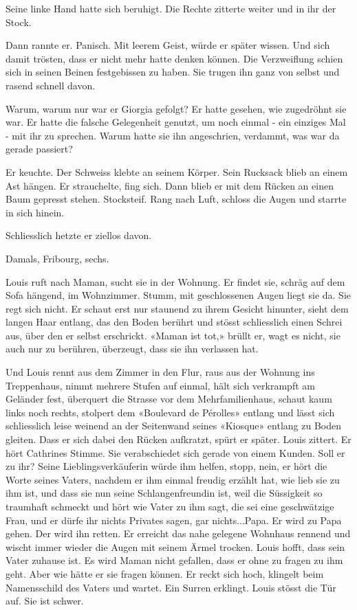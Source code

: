 Seine linke Hand hatte sich beruhigt. Die Rechte zitterte weiter und in
ihr der Stock.

Dann rannte er. Panisch. Mit leerem Geist, würde er später wissen. Und
sich damit trösten, dass er nicht mehr hatte denken können. Die
Verzweiflung schien sich in seinen Beinen festgebissen zu haben. Sie
trugen ihn ganz von selbst und rasend schnell davon.

Warum, warum nur war er Giorgia gefolgt? Er hatte gesehen, wie
zugedröhnt sie war. Er hatte die falsche Gelegenheit genutzt, um noch
einmal - ein einziges Mal - mit ihr zu sprechen. Warum hatte sie ihn
angeschrien, verdammt, was war da gerade passiert?

Er keuchte. Der Schweiss klebte an seinem Körper. Sein Rucksack blieb an
einem Ast hängen. Er strauchelte, fing sich. Dann blieb er mit dem
Rücken an einen Baum gepresst stehen. Stocksteif. Rang nach Luft,
schloss die Augen und starrte in sich hinein.

Schliesslich hetzte er ziellos davon.

Damals, Fribourg, sechs.

Louis ruft nach Maman, sucht sie in der Wohnung. Er findet sie, schräg
auf dem Sofa hängend, im Wohnzimmer. Stumm, mit geschlossenen Augen
liegt sie da. Sie regt sich nicht. Er schaut erst nur staunend zu ihrem
Gesicht hinunter, sieht dem langen Haar entlang, das den Boden berührt
und stösst schliesslich einen Schrei aus, über den er selbst erschrickt.
«Maman ist tot,» brüllt er, wagt es nicht, sie auch nur zu berühren,
überzeugt, dass sie ihn verlassen hat.

Und Louis rennt aus dem Zimmer in den Flur, raus aus der Wohnung ins
Treppenhaus, nimmt mehrere Stufen auf einmal, hält sich verkrampft am
Geländer fest, überquert die Strasse vor dem Mehrfamilienhaus, schaut
kaum links noch rechts, stolpert dem «Boulevard de Pérolles» entlang und
lässt sich schliesslich leise weinend an der Seitenwand seines «Kiosque»
entlang zu Boden gleiten. Dass er sich dabei den Rücken aufkratzt, spürt
er später. Louis zittert. Er hört Cathrines Stimme. Sie verabschiedet
sich gerade von einem Kunden. Soll er zu ihr? Seine Lieblingsverkäuferin
würde ihm helfen, stopp, nein, er hört die Worte seines Vaters, nachdem
er ihm einmal freudig erzählt hat, wie lieb sie zu ihm ist, und dass sie
nun seine Schlangenfreundin ist, weil die Süssigkeit so traumhaft
schmeckt und hört wie Vater zu ihm sagt, die sei eine geschwätzige Frau,
und er dürfe ihr nichts Privates sagen, gar nichts...Papa. Er wird zu
Papa gehen. Der wird ihn retten. Er erreicht das nahe gelegene Wohnhaus
rennend und wischt immer wieder die Augen mit seinem Ärmel trocken.
Louis hofft, dass sein Vater zuhause ist. Es wird Maman nicht gefallen,
dass er ohne zu fragen zu ihm geht. Aber wie hätte er sie fragen können.
Er reckt sich hoch, klingelt beim Namensschild des Vaters und wartet.
Ein Surren erklingt. Louis stösst die Tür auf. Sie ist schwer.

